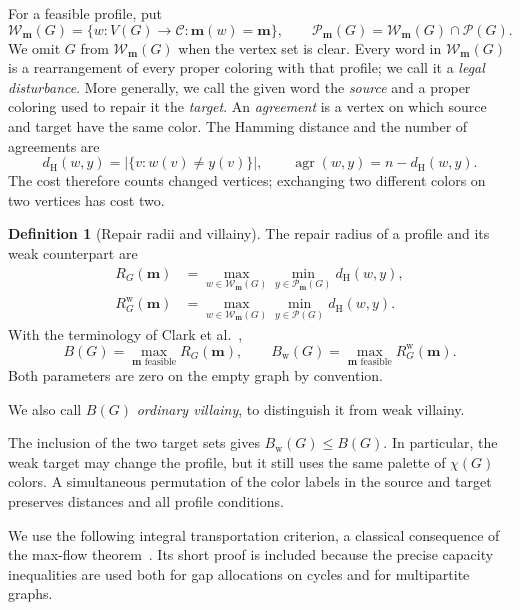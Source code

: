 \documentclass[10pt,a4paper]{amsart}
\numberwithin{equation}{section}
\theoremstyle{definition}
\newtheorem{definition}[theorem]{Definition}
\theoremstyle{remark}
\begin{document}
For a feasible profile, put
\[
 \mathcal W_{\mathbf m}(G)=
 \{w:V(G)\to\mathcal C:\mathbf m(w)=\mathbf m\},\qquad
 \mathcal P_{\mathbf m}(G)=\mathcal W_{\mathbf m}(G)\cap\mathcal P(G).
\]
We omit $G$ from $\mathcal W_{\mathbf m}(G)$ when the vertex set is clear.
Every word in $\mathcal W_{\mathbf m}(G)$ is a rearrangement of every
proper coloring with that profile; we call it a \emph{legal disturbance}.
More generally, we call the given word the \emph{source} and a proper
coloring used to repair it the \emph{target}. An \emph{agreement} is a
vertex on which source and target have the same color.
The Hamming distance and the number of agreements are
\[
 d_{\mathrm H}(w,y)=|\{v:w(v)\ne y(v)\}|,
 \qquad \operatorname{agr}(w,y)=n-d_{\mathrm H}(w,y).
\]
The cost therefore counts changed vertices; exchanging two different
colors on two vertices has cost two.

\begin{definition}[Repair radii and villainy]\label{def:repair-radii}
The repair radius of a profile and its weak counterpart are
\begin{align*}
 R_G(\mathbf m)&=
 \max_{w\in\mathcal W_{\mathbf m}(G)}
 \min_{y\in\mathcal P_{\mathbf m}(G)}d_{\mathrm H}(w,y),\\
 R^{\mathrm w}_G(\mathbf m)&=
 \max_{w\in\mathcal W_{\mathbf m}(G)}
 \min_{y\in\mathcal P(G)}d_{\mathrm H}(w,y).
\end{align*}
With the terminology of Clark et al.~\cite{clark2006},
\[
 B(G)=\max_{\mathbf m\text{ feasible}}R_G(\mathbf m),\qquad
 B_{\mathrm w}(G)=\max_{\mathbf m\text{ feasible}}R^{\mathrm w}_G(\mathbf m).
\]
Both parameters are zero on the empty graph by convention.
\end{definition}

We also call $B(G)$ \emph{ordinary villainy}, to distinguish it from
weak villainy.

The inclusion
of the two target sets gives $B_{\mathrm w}(G)\le B(G)$. In particular,
the weak target may change the profile, but it still uses the same palette
of $\chi(G)$ colors. A simultaneous permutation of the color labels in
the source and target preserves distances and all profile conditions.

We use the following integral transportation criterion, a classical
consequence of the max-flow theorem~\cite{fordfulkerson1956}.
Its short proof is included because the precise capacity inequalities
are used both for gap allocations on cycles and for multipartite graphs.
\end{document}
